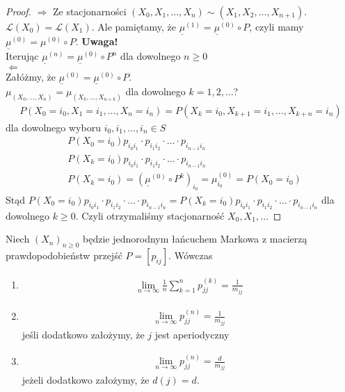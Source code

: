 \begin{proof}$ \Rightarrow $
Ze stacjonarności $ \left(X_0,X_1,\dots,X_n\right)\sim \left(X_1,X_2,\dots,X_{n+1}\right)$. $ \mathcal L(X_0)=\mathcal L(X_1) $. Ale pamiętamy, że $ \underline{\mu}^{(1)}=\underline{\mu}^{(0)}\circ P $, czyli mamy $ \underline{\mu}^{(0)}=\mu^{(0)}\circ P $.
\textbf{Uwaga!}\\
Iterując $ \underline{\mu}^{(n)}=\underline{\mu}^{(0)}\circ P^n $ dla dowolnego $ n\ge 0 $\\
$ \Leftarrow $\\
Załóżmy, że $ \underline{\mu}^{(0)}=\underline{\mu}^{(0)}\circ P $.\\
$ \mu_{(X_0,\dots,X_n)}=\mu_{(X_k,\dots,X_{n+k})} $ dla dowolnego $ k=1,2,\dots $?
\begin{gather*}
P\left(X_0=i_0,X_1=i_1,\dots,X_n=i_n\right)=
P\left(X_k=i_0,X_{k+1}=i_1,\dots,X_{k+n}=i_n\right)
\end{gather*}
dla dowolnego wyboru $ i_0,i_1,\dots,i_n\in S $
\begin{align*}
&P\left(X_0=i_0\right)p_{i_0i_1}\cdot p_{i_1i_2}\cdot\ldots \cdot p_{i_{n-1}i_n}\\
&P\left(X_k=i_0\right)p_{i_0i_1}\cdot p_{i_1i_2}\cdot\ldots \cdot p_{i_{n-1}i_n}\\
&P\left(X_k=i_0\right)=\left(\underline{\mu}^{(0)}\circ P^k\right)_{i_0}=\mu_{i_0}^{(0)}=P\left(X_0=i_0\right)
\end{align*}
Stąd $ P\left(X_0=i_0\right)p_{i_0i_1}\cdot p_{i_1i_2}\cdot\ldots \cdot p_{i_{n-1}i_n}=P\left(X_k=i_0\right)p_{i_0i_1}\cdot p_{i_1i_2}\cdot\ldots \cdot p_{i_{n-1}i_n} $ dla dowolnego $ k\ge 0 $. Czyli otrzymaliśmy stacjonarność $ X_0,X_1,\dots  $
\end{proof}
\begin{twr}
Niech $ \left(X_n\right)_{n\ge 0} $ będzie jednorodnym łańcuchem Markowa z macierzą prawdopodobieństw przejść $ P=[p_{ij}] $. Wówczas
\begin{enumerate}
\item
\begin{gather*}
\lim\limits_{n\to\infty} \frac{1}{n}\sum_{k=1}^{n}p_{jj}^{(k)}=\frac{1}{m_{jj}}
\end{gather*}
\item 
\begin{gather*}
\lim\limits_{n\to\infty} p_{jj}^{(n)}=\frac{1}{m_{jj}}
\end{gather*}
jeśli dodatkowo założymy, że $ j $ jest aperiodyczny
\item 
\begin{gather*}
\lim\limits_{n\to\infty} p_{jj}^{(n)}=\frac{d}{m_{jj}}
\end{gather*}
jeżeli dodatkowo założymy, że $ d(j)=d $.
\end{enumerate}
\end{twr}

